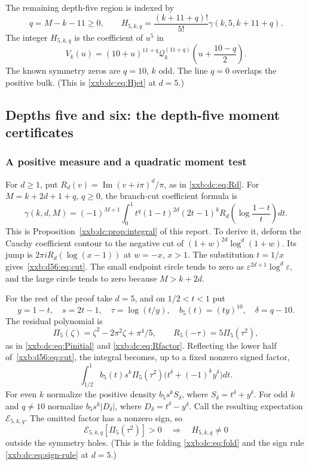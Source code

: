 \documentclass[11pt,a4paper]{article}
\numberwithin{equation}{section}
\theoremstyle{definition}
\theoremstyle{remark}
\theoremstyle{plain}
\newcommand{\fall}[2]{#1^{\underline{#2}}}
\begin{document}
The remaining depth-five region is indexed by
\[
 q=M-k-11\ge0,\qquad
 H_{5,k,q}=\frac{(k+11+q)!}{5!}\gamma(k,5,k+11+q).
\]
The integer $H_{5,k,q}$ is the coefficient of $u^5$ in
\begin{equation}\label{xxb:d56:eq:jet}
 V_k(u)=\fall{(10+u)}{11+q}
 \mathcal Q_k^{(11+q)}\left(u+\frac{10-q}{2}\right).
\end{equation}
The known symmetry zeros are $q=10$, $k$ odd. The line $q=0$ overlaps the
positive bulk.  (This is \eqref{xxb:dc:eq:Hjet} at $d=5$.)

\subsection{Depths five and six: the depth-five moment certificates}\label{xxb:d56:sec:five}

\subsubsection{A positive measure and a quadratic moment test}

For $d\ge1$, put $R_d(v)=\operatorname{Im}(v+i\pi)^d/\pi$, as in
\eqref{xxb:dc:eq:Rd}. For $M=k+2d+1+q$, $q\ge0$, the branch-cut coefficient
formula is
\begin{equation}\label{xxb:d56:eq:cut}
 \gamma(k,d,M)=(-1)^{M+1}\int_0^1
 t^q(1-t)^{2d}(2t-1)^k
 R_d\left(\log\frac{1-t}{t}\right)dt.
\end{equation}
This is Proposition~\ref{xxb:dc:prop:integral} of this report. To derive it,
deform the Cauchy coefficient contour to the negative cut of
$(1+w)^{2d}\log^d(1+w)$. Its jump is $2\pi iR_d(\log(x-1))$ at $w=-x$, $x>1$.
The substitution $t=1/x$ gives~\eqref{xxb:d56:eq:cut}. The small endpoint
circle tends to zero as $\varepsilon^{2d+1}\log^d\varepsilon$, and the large
circle tends to zero because $M>k+2d$.

For the rest of the proof take $d=5$, and on $1/2<t<1$ put
\[
 y=1-t,\quad s=2t-1,\quad \tau=\log(t/y),\quad
 b_5(t)=(ty)^{10},\quad\delta=q-10.
\]
The residual polynomial is
\begin{equation}\label{xxb:d56:eq:Pi}
 \Pi_5(\zeta)=\zeta^2-2\pi^2\zeta+\pi^4/5,\qquad R_5(-\tau)=5\Pi_5(\tau^2),
\end{equation}
as in \eqref{xxb:dc:eq:Pinitial} and \eqref{xxb:dc:eq:Rfactor}.
Reflecting the lower half of~\eqref{xxb:d56:eq:cut}, the integral becomes, up
to a fixed nonzero signed factor,
\[
 \int_{1/2}^1b_5(t)s^k\Pi_5(\tau^2)
 \bigl(t^\delta+(-1)^k y^\delta\bigr)dt.
\]
For even $k$ normalize the positive density $b_5s^kS_\delta$, where
$S_\delta=t^\delta+y^\delta$. For odd $k$ and $q\ne10$ normalize
$b_5s^k|D_\delta|$, where $D_\delta=t^\delta-y^\delta$. Call the resulting
expectation $\mathcal E_{5,k,q}$. The omitted factor has a nonzero sign, so
\begin{equation}\label{xxb:d56:eq:signcriterion}
 \mathcal E_{5,k,q}[\Pi_5(\tau^2)]>0\quad\Longrightarrow\quad H_{5,k,q}\ne0
\end{equation}
outside the symmetry holes.  (This is the folding \eqref{xxb:dc:eq:fold} and
the sign rule \eqref{xxb:dc:eq:sign-rule} at $d=5$.)
\end{document}
